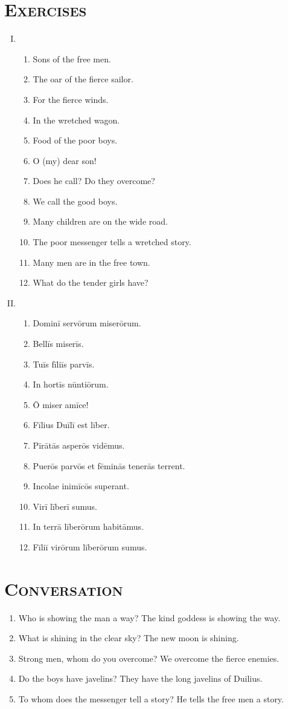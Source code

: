 \documentclass[12pt]{article}
\begin{document}
\section{\textsc{Exercises}}
\begin{enumerate}[I.]
	\setlength{\itemsep}{1em}
	\item \begin{enumerate}[1)]
		\item Sons of the free men.
		\item The oar of the fierce sailor.
		\item For the fierce winds.
		\item In the wretched wagon.
		\item Food of the poor boys.
		\item O (my) dear son!
		\item Does he call? Do they overcome?
		\item We call the good boys.
		\item Many children are on the wide road.
		\item The poor messenger tells a wretched story.
		\item Many men are in the free town.
		\item What do the tender girls have?
	\end{enumerate}
	\item \begin{enumerate}[1)]
		\item Dominī servōrum miserōrum.
		\item Bellīs miserīs.
		\item Tuīs fīliīs parvīs.
		\item In hortīs nūntiōrum.
		\item Ō miser amīce!
		\item Fīlius Duīlī est līber.
		\item Pīrātās asperōs vidēmus.
		\item Puerōs parvōs et fēminās tenerās terrent.
		\item Incolae inimīcōs superant.
		\item Virī līberī sumus.
		\item In terrā līberōrum habitāmus.
		\item Fīliī virōrum līberōrum sumus.
	\end{enumerate}
\end{enumerate}

\section{\textsc{Conversation}}
\begin{enumerate}[1.]
	\item Who is showing the man a way? The kind goddess is showing the way.
	\item What is shining in the clear sky? The new moon is shining.
	\item Strong men, whom do you overcome? We overcome the fierce enemies.
	\item Do the boys have javelins? They have the long javelins of Duilius.
	\item To whom does the messenger tell a story? He tells the free men a story.
\end{enumerate}
\end{document}
